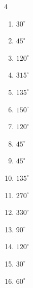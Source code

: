 \begin{multicols}{4}
\begin{enumerate}
  \item $\displaystyle 30^{\circ}$

  \item $\displaystyle 45^{\circ}$

  \item $\displaystyle 120^{\circ}$

  \item $\displaystyle 315^{\circ}$

  \item $\displaystyle 135^{\circ}$

  \item $\displaystyle 150^{\circ}$

  \item $\displaystyle 120^{\circ}$

  \item $\displaystyle 45^{\circ}$

  \item $\displaystyle 45^{\circ}$

  \item $\displaystyle 135^{\circ}$

  \item $\displaystyle 270^{\circ}$

  \item $\displaystyle 330^{\circ}$

  \item $\displaystyle 90^{\circ}$

  \item $\displaystyle 120^{\circ}$

  \item $\displaystyle 30^{\circ}$

  \item $\displaystyle 60^{\circ}$


\end{enumerate}
\end{multicols}
